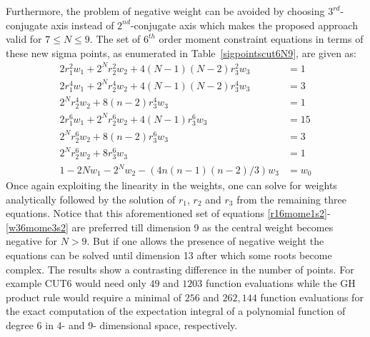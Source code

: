 \documentclass[letterpaper, 10 pt, conference]{IEEEtran}  %
\newcommand{\comments}[1]{}
\begin{document}
Furthermore, the problem of negative weight can be avoided by choosing  $3^{rd}$-conjugate axis instead of $2^{nd}$-conjugate axis which makes the proposed approach valid for $7\le N \le9$. The set of $6^{th}$ order moment constraint equations in terms of these new sigma points, as enumerated in Table~\ref{sigpointscut6N9},  are given as: 
\begin{align}
2r_1^2w_1+2^Nr_2^2w_2+4(N-1)(N-2)r_3^2w_3&=1\label{r16mome1s2}\\
2r_1^4w_1+2^Nr_2^4w_2+4(N-1)(N-2)r_3^4w_3&=3\label{r26mome2s2}\\
2^Nr_2^4w_2+8(n-2)r_3^4w_3&=1\label{r36mome3s2}\\
2r_1^6w_1+2^Nr_2^6w_2+4(N-1)r_3^6w_3&=15\label{w16mome1s2}\\
2^Nr_2^6w_2+8(n-2)r_3^6w_3&=3\label{w26mome2s2}\\
2^Nr_2^6w_2+8r_3^6w_3&=1\label{w36mome3s2}\\
1-2Nw_1-2^Nw_2-({4n(n-1)(n-2)}/{3})w_3&=w_0
\end{align}
Once again exploiting the linearity in the weights, one can solve for weights analytically followed by the solution of $r_1$, $r_2$ and $r_3$ from the remaining three equations. Notice that this aforementioned set of equations \eqref{r16mome1s2}-\eqref{w36mome3s2} are preferred till dimension 9  as the central weight becomes negative for $N>9$. But if one allows the presence of negative weight the equations can be solved until dimension 13 after which some roots become complex. The results show a contrasting difference in the number of points. For example CUT6 would need only $49$ and $1203$ function evaluations  while the GH product rule would require a minimal of $256$ and $262,144$ function evaluations for the exact computation of the expectation integral of a polynomial function of degree 6 in 4- and 9- dimensional space, respectively.
\end{document}
